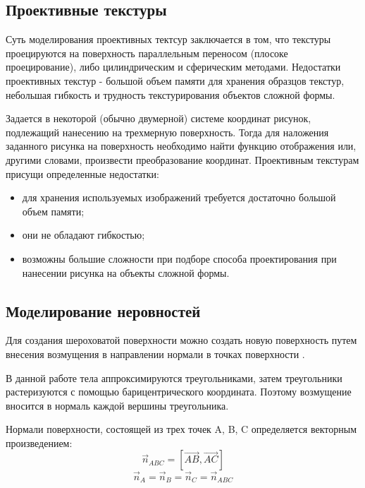 \subsection{Проективные текстуры}
Суть моделирования проективных тектсур заключается в том, что текстуры проецируются на поверхность параллельным переносом (плосоке проецирование), либо цилиндрическим и сферическим методами.
Недостатки проективных текстур - большой объем памяти для хранения образцов текстур, небольшая гибкость и трудность текстурирования объектов сложной формы. 

Задается в некоторой (обычно двумерной) системе координат рисунок, подлежащий нанесению на трехмерную поверхность.
Тогда для наложения заданного рисунка на поверхность необходимо найти функцию отображения или, другими словами, произвести преобразование координат.
Проективным текстурам присущи определенные недостатки:
\begin{itemize}
	\item для хранения используемых изображений требуется достаточно большой объем памяти;
	\item они не обладают гибкостью;
	\item возможны большие сложности при подборе способа проектирования при нанесении рисунка на объекты сложной формы.
\end{itemize}

\subsection{Моделирование неровностей}

Для создания шероховатой поверхности можно создать новую поверхность путем внесения возмущения в направлении нормали в точках поверхности \cite{roders}.

В данной работе тела аппроксимируются треугольниками, затем треугольники растеризуются с помощью барицентрического координата.
Поэтому возмущение вносится в нормаль каждой вершины треугольника.

Нормали поверхности, состоящей из трех точек A, B, C определяется векторным произведением:
\begin{equation}
	\overrightarrow n_{ABC} = [\overrightarrow {AB}, \overrightarrow {AC}]
\end{equation}
\begin{equation}
	 \overrightarrow n_A = \overrightarrow n_B = \overrightarrow n_C = \overrightarrow n_{ABC}
\end{equation}

